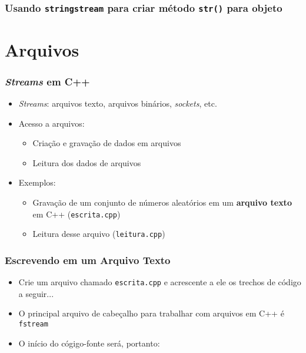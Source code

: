 \documentclass[aspectratio=169]{beamer}
\begin{document}
\begin{frame}[fragile]\frametitle{Usando \texttt{stringstream} para criar método \texttt{str()} para objeto}

\end{frame}

\section{Arquivos}

\begin{frame}\frametitle{\emph{Streams} em C++}
\begin{itemize}
	\item \emph{Streams}: arquivos texto, arquivos binários, \emph{sockets}, etc.
	\item Acesso a arquivos:
	\begin{itemize}
		\item Criação e gravação de dados em arquivos
		\item Leitura dos dados de arquivos
	\end{itemize}
	\item Exemplos:
	\begin{itemize}
		\item Gravação de um conjunto de números aleatórios em um \textbf{arquivo texto} em C++ (\texttt{escrita.cpp})
		\item Leitura desse arquivo (\texttt{leitura.cpp})
	\end{itemize}
\end{itemize}
\end{frame}

\begin{frame}[fragile]\frametitle{Escrevendo em um Arquivo Texto}
\begin{itemize}
	\item Crie um arquivo chamado \texttt{escrita.cpp} e acrescente a ele os trechos de código a seguir...
	\item O principal arquivo de cabeçalho para trabalhar com arquivos em C++ é \texttt{fstream}
	\item O início do cógigo-fonte será, portanto:

\end{itemize}
\end{frame}
\end{document}
